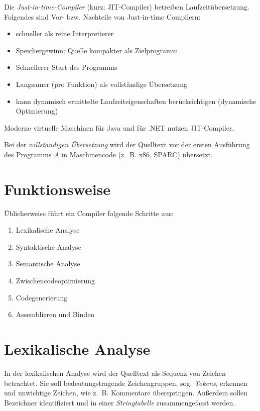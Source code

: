 
Die \textit{Just-in-time-Compiler} (kurz: JIT-Compiler) betreiben
Laufzeitübersetzung. Folgendes sind Vor- bzw. Nachteile von Just-in-time Compilern:
\begin{itemize}
	\item schneller als reine Interpretierer
	\item Speichergewinn: Quelle kompakter als Zielprogramm
	\item Schnellerer Start des Programms
	\item Langsamer (pro Funktion) als vollständige Übersetzung
	\item kann dynamisch ermittelte Laufzeiteigenschaften berücksichtigen (dynamische Optimierung)
\end{itemize}

Moderne virtuelle Maschinen für Java und für .NET nutzen JIT-Compiler.

Bei der \textit{vollständigen Übersetzung} wird der Quelltext vor der ersten
Ausführung des Programms $A$ in Maschinencode (z.~B. x86, SPARC) übersetzt.


\section{Funktionsweise}
Üblicherweise führt ein Compiler folgende Schritte aus:
\begin{enumerate}
	\item Lexikalische Analyse
	\item Syntaktische Analyse
	\item Semantische Analyse
	\item Zwischencodeoptimierung
	\item Codegenerierung
    \item Assemblieren und Binden
\end{enumerate}

\section{Lexikalische Analyse}%
In der lexikalischen Analyse wird der Quelltext als Sequenz von Zeichen betrachtet.
Sie soll bedeutungstragende Zeichengruppen, sog. \textit{Tokens},
erkennen und unwichtige Zeichen, wie z.~B. Kommentare überspringen. Außerdem
sollen Bezeichner identifiziert und in einer \textit{Stringtabelle}
zusammengefasst werden.

